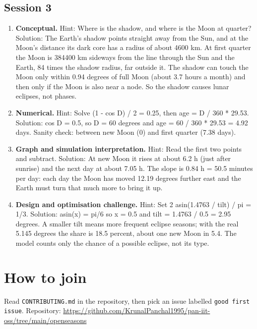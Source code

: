 \documentclass[11pt,a4paper]{article}
\begin{document}
\subsection*{Session 3}
\begin{enumerate}[nosep]
\item \textbf{Conceptual.} Hint: Where is the shadow, and where is the Moon at quarter? Solution: The Earth's shadow points straight away from the Sun, and at the Moon's distance its dark core has a radius of about 4600 km. At first quarter the Moon is 384400 km sideways from the line through the Sun and the Earth, 84 times the shadow radius, far outside it. The shadow can touch the Moon only within 0.94 degrees of full Moon (about 3.7 hours a month) and then only if the Moon is also near a node. So the shadow causes lunar eclipses, not phases.
\item \textbf{Numerical.} Hint: Solve (1 - cos D) / 2 = 0.25, then age = D / 360 * 29.53. Solution: cos D = 0.5, so D = 60 degrees and age = 60 / 360 * 29.53 = 4.92 days. Sanity check: between new Moon (0) and first quarter (7.38 days).
\item \textbf{Graph and simulation interpretation.} Hint: Read the first two points and subtract. Solution: At new Moon it rises at about 6.2 h (just after sunrise) and the next day at about 7.05 h. The slope is 0.84 h = 50.5 minutes per day: each day the Moon has moved 12.19 degrees further east and the Earth must turn that much more to bring it up.
\item \textbf{Design and optimisation challenge.} Hint: Set 2 asin(1.4763 / tilt) / pi = 1/3. Solution: asin(x) = pi/6 so x = 0.5 and tilt = 1.4763 / 0.5 = 2.95 degrees. A smaller tilt means more frequent eclipse seasons; with the real 5.145 degrees the share is 18.5 percent, about one new Moon in 5.4. The model counts only the chance of a possible eclipse, not its type.
\end{enumerate}

\section{How to join}
Read \texttt{CONTRIBUTING.md} in the repository, then pick an issue labelled \texttt{good first issue}. Repository: \url{https://github.com/KrunalPanchal1995/pan-iit-oss/tree/main/openseasons}
\end{document}
